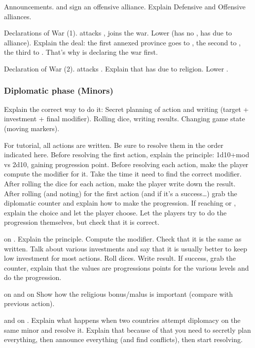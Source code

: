 \aparag Announcements.
\bparag \RUS and \POL sign an offensive alliance.
\bparag Explain Defensive and Offensive alliances.

\aparag Declarations of War (1).
\bparag \RUS attacks \paysDon, \POL joins the war.
\bparag Lower \STAB (\RUS has no \CB, \POL has due to alliance).
\bparag Explain the deal: the first annexed province goes to \RUS, the second
to \paysUkraine, the third to \RUS. That's why \RUS is declaring the war
first.

\aparag Declaration of War (2).
\bparag \TUR attacks \paysGeorgie.
\bparag Explain that \TUR has \CB due to religion. Lower \STAB.

\subsubsection{Diplomatic phase (Minors)}
\aparag Explain the correct way to do it:
\bparag Secret planning of action and writing (target + investment + final
modifier).
\bparag Rolling dice, writing results.
\bparag Changing game state (moving markers).

\aparag For tutorial, all actions are written. Be sure to resolve them in the
order indicated here.
\bparag Before resolving the first action, explain the principle: 1d10+mod vs
2d10, gaining progression point.
\bparag Before resolving each action, make the player compute the modifier for
it. Take the time it need to find the correct modifier.
\bparag After rolling the dice for each action, make the player write down the
result.
\bparag After rolling (and noting) for the first action (and if it's a
success\ldots) grab the diplomatic counter and explain how to make the
progression.
\bparag If reaching \SUB or \RM, explain the choice and let the player
choose.
\bparag Let the players try to do the progression themselves, but check that
it is correct.

\aparag \POL on \paysBrandebourg.
\bparag Explain the principle. Compute the modifier. Check that it is the same
as written.
\bparag Talk about various investments and say that it is usually better to
keep low investment for most actions.
\bparag Roll dices. Write result.
\bparag If success, grab the counter, explain that the values are progressions
points for the various levels and do the progression.

\aparag \POR on \paysMaroc and \VEN on \paysPerse
\bparag Show how the religious bonus/malus is important (compare with previous
action).

\aparag \RUS and \TUR on \paysKazan.
\bparag Explain what happens when two countries attempt diplomacy on the same
minor and resolve it.
\bparag Explain that because of that you need to secretly plan everything,
then announce everything (and find conflicts), then start resolving.

